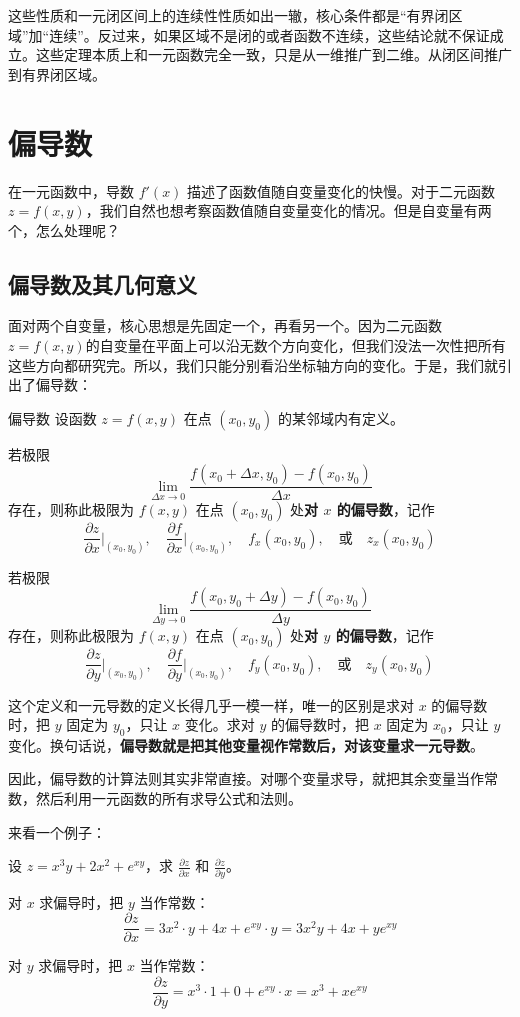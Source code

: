 这些性质和一元闭区间上的连续性性质如出一辙，核心条件都是“有界闭区域”加“连续”。反过来，如果区域不是闭的或者函数不连续，这些结论就不保证成立。这些定理本质上和一元函数完全一致，只是从一维推广到二维。从闭区间推广到有界闭区域。

\section{偏导数}
在一元函数中，导数 $f'(x)$ 描述了函数值随自变量变化的快慢。对于二元函数 $z = f(x,y)$，我们自然也想考察函数值随自变量变化的情况。但是自变量有两个，怎么处理呢？

\subsection{偏导数及其几何意义}
面对两个自变量，核心思想是先固定一个，再看另一个。因为二元函数 $z = f(x,y)$的自变量在平面上可以沿无数个方向变化，但我们没法一次性把所有这些方向都研究完。所以，我们只能分别看沿坐标轴方向的变化。于是，我们就引出了偏导数：

\begin{definition}{偏导数}{}
设函数 $z = f(x,y)$ 在点 $(x_0, y_0)$ 的某邻域内有定义。

若极限
\[
\lim_{\Delta x \to 0} \frac{f(x_0 + \Delta x, y_0) - f(x_0, y_0)}{\Delta x}
\]
存在，则称此极限为 $f(x,y)$ 在点 $(x_0, y_0)$ 处\textbf{对 $x$ 的偏导数}，记作
\[
\frac{\partial z}{\partial x}\Big|_{(x_0,y_0)},\quad \frac{\partial f}{\partial x}\Big|_{(x_0,y_0)},\quad f_x(x_0,y_0),\quad \text{或}\quad z_x(x_0,y_0)
\]

若极限
\[
\lim_{\Delta y \to 0} \frac{f(x_0, y_0 + \Delta y) - f(x_0, y_0)}{\Delta y}
\]
存在，则称此极限为 $f(x,y)$ 在点 $(x_0, y_0)$ 处\textbf{对 $y$ 的偏导数}，记作
\[
\frac{\partial z}{\partial y}\Big|_{(x_0,y_0)},\quad \frac{\partial f}{\partial y}\Big|_{(x_0,y_0)},\quad f_y(x_0,y_0),\quad \text{或}\quad z_y(x_0,y_0)
\]
\end{definition}

这个定义和一元导数的定义长得几乎一模一样，唯一的区别是求对 $x$ 的偏导数时，把 $y$ 固定为 $y_0$，只让 $x$ 变化。求对 $y$ 的偏导数时，把 $x$ 固定为 $x_0$，只让 $y$ 变化。换句话说，\textbf{偏导数就是把其他变量视作常数后，对该变量求一元导数}。

因此，偏导数的计算法则其实非常直接。对哪个变量求导，就把其余变量当作常数，然后利用一元函数的所有求导公式和法则。

来看一个例子：

\begin{myexample}
设 $z = x^3y + 2x^2 + e^{xy}$，求 $\frac{\partial z}{\partial x}$ 和 $\frac{\partial z}{\partial y}$。

对 $x$ 求偏导时，把 $y$ 当作常数：
\[
\frac{\partial z}{\partial x} = 3x^2 \cdot y + 4x + e^{xy} \cdot y = 3x^2y + 4x + y e^{xy}
\]

对 $y$ 求偏导时，把 $x$ 当作常数：
\[
\frac{\partial z}{\partial y} = x^3 \cdot 1 + 0 + e^{xy} \cdot x = x^3 + x e^{xy}
\]
\end{myexample}

